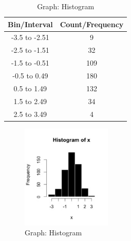 \begin{table}[H]
    \begin{minipage}{0.45\textwidth}
        \centering
        \begin{tabular}{|c|c|}
            \hline
            Bin/Interval & Count/Frequency \\ \hline
            -3.5 to -2.51 & 9 \\ \hline
            -2.5 to -1.51 & 32 \\ \hline
            -1.5 to -0.51 & 109 \\ \hline
            -0.5 to 0.49 & 180 \\ \hline
            0.5 to 1.49 & 132 \\ \hline
            1.5 to 2.49 & 34 \\ \hline
            2.5 to 3.49 & 4 \\ \hline
        \end{tabular}
        \caption{Data: Histogram}
    \end{minipage}
    \hfill
    \begin{minipage}{0.45\textwidth}
        \begin{figure}[H]
            \centering
            \includegraphics[height=5cm]{Pictures/data/data_histogram.jpg}
            \caption{Graph: Histogram}
        \end{figure}
    \end{minipage}
\end{table}


